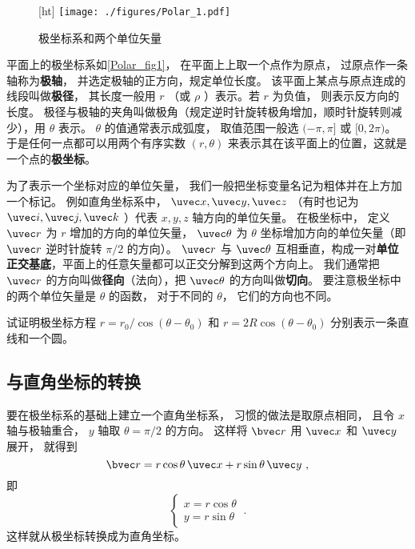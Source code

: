 
\begin{figure}\label{Polar_fig1}[ht]
\centering
\texttt{[image: ./figures/Polar\_1.pdf]}
\caption{极坐标系和两个单位矢量}
\end{figure}

平面上的极坐标系如\autoref{Polar_fig1}， 在平面上上取一个点作为原点， 过原点作一条轴称为\textbf{极轴}， 并选定极轴的正方向，规定单位长度。 该平面上某点与原点连成的线段叫做\textbf{极径}， 其长度一般用 $r$ （或 $\rho$ ）表示。若 $r$ 为负值， 则表示反方向的长度。 极径与极轴的夹角叫做极角（规定逆时针旋转极角增加，顺时针旋转则减少），用 $\theta $ 表示。 $\theta$ 的值通常表示成弧度， 取值范围一般选 $(-\pi, \pi]$ 或 $[0, 2\pi)$。 于是任何一点都可以用两个有序实数 $(r,\theta)$ 来表示其在该平面上的位置，这就是一个点的\textbf{极坐标}。

为了表示一个坐标对应的单位矢量， 我们一般把坐标变量名记为粗体并在上方加一个标记。 例如直角坐标系中， $\uvec x, \uvec y, \uvec z$ （有时也记为 $\uvec i, \uvec j, \uvec k$ ）代表 $x,y,z$ 轴方向的单位矢量。 在极坐标中， 定义 $\uvec r$ 为 $r$ 增加的方向的单位矢量， $\uvec \theta$ 为 $\theta$ 坐标增加方向的单位矢量（即 $\uvec r$ 逆时针旋转 $\pi/2$ 的方向）。 $\uvec r$ 与 $\uvec \theta$ 互相垂直，构成一对\textbf{单位正交基底}，平面上的任意矢量都可以正交分解到这两个方向上。 我们通常把 $\uvec r$ 的方向叫做\textbf{径向}（法向），把 $\uvec \theta $ 的方向叫做\textbf{切向}。 要注意极坐标中的两个单位矢量是 $\theta$ 的函数， 对于不同的 $\theta$， 它们的方向也不同。

\begin{exercise}{}
试证明极坐标方程 $r = r_0/\cos(\theta - \theta_0)$ 和 $r = 2R\cos(\theta - \theta_0)$ 分别表示一条直线和一个圆。
\end{exercise}

\subsection{与直角坐标的转换}
要在极坐标系的基础上建立一个直角坐标系， 习惯的做法是取原点相同， 且令 $x$ 轴与极轴重合， $y$ 轴取 $\theta = \pi/2$ 的方向。 这样将 $\bvec r$ 用 $\uvec x$ 和 $\uvec y$ 展开， 就得到
\begin{equation}
\bvec r = r\cos\theta\,\uvec x + r\sin\theta\,\uvec y~,
\end{equation}
即
\begin{equation}\label{Polar_eq2}
\begin{cases}
x = r\cos\theta\\
y = r\sin\theta
\end{cases}~.
\end{equation}
这样就从极坐标转换成为直角坐标。

